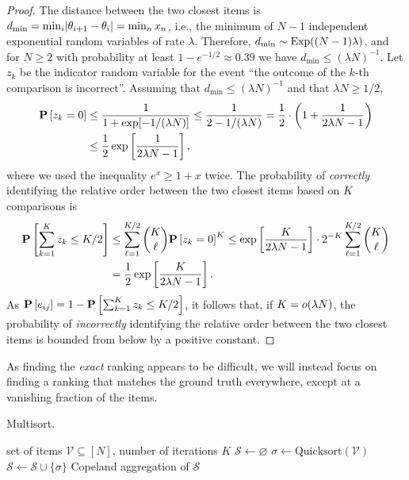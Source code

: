 \begin{proof}
The distance between the two closest items is $d_{\min} = \min_i \lvert\theta_{i+1} - \theta_{i}\rvert = \min_n x_n$, i.e., the minimum of $N-1$ independent exponential random variables of rate $\lambda$.
Therefore, $d_{\min} \sim \mathrm{Exp}( (N-1)\lambda )$, and for $N \ge 2$ with probability at least $1 - e^{-1/2} \approx 0.39$ we have $d_{\min} \le (\lambda N)^{-1}$.
Let $z_k$ be the indicator random variable for the event ``the outcome of the $k$-th comparison is incorrect''.
Assuming that $d_{\min} \le (\lambda N)^{-1}$ and that $\lambda N \ge 1/2$,
\begin{align*}
\mathbf{P}\left[ z_k = 0 \right]
    &\le \frac{1}{1 + \exp[-1 / (\lambda N)]} \le \frac{1}{2 - 1/(\lambda N)}
     = \frac{1}{2} \cdot \left( 1 + \frac{1}{2\lambda N - 1} \right) \\
    &\le \frac{1}{2} \exp \left[ \frac{1}{2\lambda N - 1} \right],
\end{align*}
where we used the inequality $e^{x} \ge 1 + x$ twice.
The probability of \emph{correctly} identifying the relative order between the two closest items based on $K$ comparisons is
\begin{align*}
\mathbf{P}\left[ \sum_{k = 1}^K z_k \le K/2 \right]
    &\le \sum_{\ell = 1}^{K/2} \binom{K}{\ell} \mathbf{P}\left[ z_k = 0 \right]^K
     \le \exp \left[ \frac{K}{2\lambda N - 1} \right] \cdot 2^{-K} \sum_{\ell = 1}^{K/2} \binom{K}{\ell} \\
    &= \frac{1}{2} \exp \left[ \frac{K}{2\lambda N - 1} \right].
\end{align*}
As $\mathbf{P}\left[ e_{ij} \right] = 1 - \mathbf{P}\left[ \sum_{k = 1}^K z_k \le K/2 \right]$, it follows that, if $K = o(\lambda N)$, the probability of \emph{incorrectly} identifying the relative order between the two closest items is bounded from below by a positive constant.
\end{proof}

As finding the \emph{exact} ranking appears to be difficult, we will instead focus on finding a ranking that matches the ground truth everywhere, except at a vanishing fraction of the items.

\begin{algorithm}[t]
   \caption{Multisort.}
   \label{rs:alg:multisort}
\begin{algorithmic}[1]
   \Require set of items $\mathcal{V} \subseteq [N]$, number of iterations $K$
   \State $\mathcal{S} \gets \varnothing$
     \State $\sigma \gets \text{Quicksort}(\mathcal{V})$
     \State $\mathcal{S} \gets \mathcal{S} \cup \{ \sigma \}$
   \EndFor
   \State \Return Copeland aggregation of $\mathcal{S}$
\end{algorithmic}
\end{algorithm}

